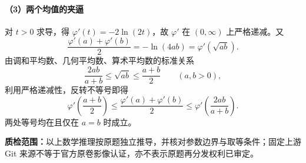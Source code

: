 \documentclass[UTF8,a4paper,10pt]{ctexart}
\begin{document}
\paragraph{（3）两个均值的夹逼}
对 $t>0$ 求导，得 $\varphi'(t)=-2\ln(2t)$，故 $\varphi'$ 在 $(0,\infty)$ 上严格递减。又
\[
\frac{\varphi'(a)+\varphi'(b)}{2}
=-\ln(4ab)=\varphi'(\sqrt{ab}).
\]
由调和平均数、几何平均数、算术平均数的标准关系
\[
\frac{2ab}{a+b}\leq\sqrt{ab}\leq\frac{a+b}{2}
\qquad(a,b>0),
\]
利用严格递减性，反转不等号即得
\[
\boxed{\;\varphi'\!\left(\frac{a+b}{2}\right)
\leq\frac{\varphi'(a)+\varphi'(b)}{2}
\leq\varphi'\!\left(\frac{2ab}{a+b}\right).\;}
\]
两处等号均在且仅在 $a=b$ 时成立。

\medskip\noindent\textbf{质检范围：}以上数学推理按原题独立推导，并核对参数边界与取等条件；固定上游 Git 来源不等于官方原卷影像认证，亦不表示原题再分发权利已审定。
\end{document}
